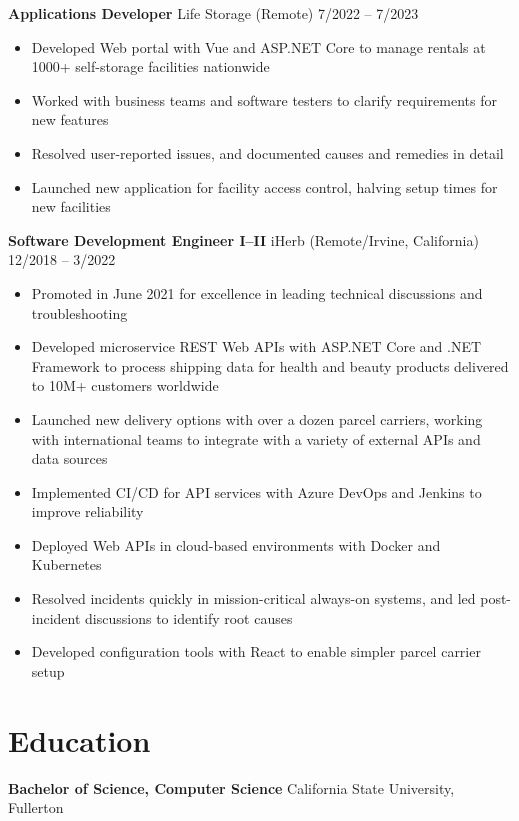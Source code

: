 \documentclass[12pt]{article}
\newcommand{\primaryheader}[4]{\textbf{#1} \symbol{"B7} #3 (#4) \hfill #2}
\begin{document}
	\primaryheader{Applications Developer}{7/2022 -- 7/2023}{Life Storage}{Remote}

	\begin{itemize}
		\item Developed Web portal with Vue and ASP.NET Core to manage rentals at 1000+ self-storage facilities nationwide
		\item Worked with business teams and software testers to clarify requirements for new features
		\item Resolved user-reported issues, and documented causes and remedies in detail
		\item Launched new application for facility access control, halving setup times for new facilities
	\end{itemize}

	\primaryheader{Software Development Engineer I--II}{12/2018 -- 3/2022}{iHerb}{Remote/Irvine, California}

	\begin{itemize}
		\item Promoted in June 2021 for excellence in leading technical discussions and troubleshooting
		\item Developed microservice REST Web APIs with ASP.NET Core and .NET Framework to process shipping data for health and beauty products delivered to 10M+ customers worldwide
		\item Launched new delivery options with over a dozen parcel carriers, working with international teams to integrate with a variety of external APIs and data sources
		\item Implemented CI/CD for API services with Azure DevOps and Jenkins to improve reliability
		\item Deployed Web APIs in cloud-based environments with Docker and Kubernetes
		\item Resolved incidents quickly in mission-critical always-on systems, and led post-incident discussions to identify root causes
		\item Developed configuration tools with React to enable simpler parcel carrier setup
	\end{itemize}

	\section*{Education}

	\textbf{Bachelor of Science, Computer Science}  California State University, Fullerton
\end{document}
